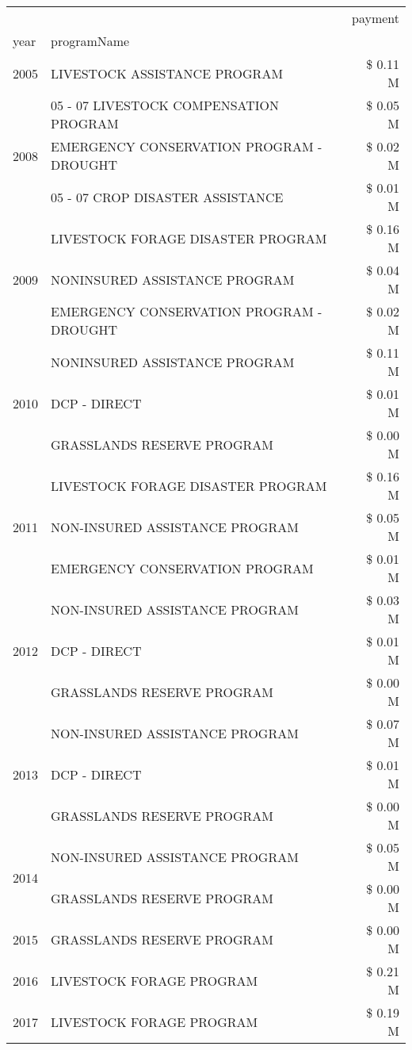 \begin{tabular}{llr}
\toprule
 &  & payment \\
year & programName &  \\
\midrule
2005 & LIVESTOCK ASSISTANCE PROGRAM & \$ 0.11 M \\
\cline{1-3}
\multirow[t]{3}{*}{2008} & 05 - 07 LIVESTOCK COMPENSATION PROGRAM & \$ 0.05 M \\
 & EMERGENCY CONSERVATION PROGRAM - DROUGHT & \$ 0.02 M \\
 & 05 - 07 CROP DISASTER ASSISTANCE & \$ 0.01 M \\
\cline{1-3}
\multirow[t]{3}{*}{2009} & LIVESTOCK FORAGE DISASTER  PROGRAM & \$ 0.16 M \\
 & NONINSURED ASSISTANCE PROGRAM & \$ 0.04 M \\
 & EMERGENCY CONSERVATION PROGRAM - DROUGHT & \$ 0.02 M \\
\cline{1-3}
\multirow[t]{3}{*}{2010} & NONINSURED ASSISTANCE PROGRAM & \$ 0.11 M \\
 & DCP - DIRECT & \$ 0.01 M \\
 & GRASSLANDS RESERVE PROGRAM & \$ 0.00 M \\
\cline{1-3}
\multirow[t]{3}{*}{2011} & LIVESTOCK FORAGE DISASTER PROGRAM & \$ 0.16 M \\
 & NON-INSURED ASSISTANCE PROGRAM & \$ 0.05 M \\
 & EMERGENCY CONSERVATION PROGRAM & \$ 0.01 M \\
\cline{1-3}
\multirow[t]{3}{*}{2012} & NON-INSURED ASSISTANCE PROGRAM & \$ 0.03 M \\
 & DCP - DIRECT & \$ 0.01 M \\
 & GRASSLANDS RESERVE PROGRAM & \$ 0.00 M \\
\cline{1-3}
\multirow[t]{3}{*}{2013} & NON-INSURED ASSISTANCE PROGRAM & \$ 0.07 M \\
 & DCP - DIRECT & \$ 0.01 M \\
 & GRASSLANDS RESERVE PROGRAM & \$ 0.00 M \\
\cline{1-3}
\multirow[t]{2}{*}{2014} & NON-INSURED ASSISTANCE PROGRAM & \$ 0.05 M \\
 & GRASSLANDS RESERVE PROGRAM & \$ 0.00 M \\
\cline{1-3}
2015 & GRASSLANDS RESERVE PROGRAM & \$ 0.00 M \\
\cline{1-3}
2016 & LIVESTOCK FORAGE PROGRAM & \$ 0.21 M \\
\cline{1-3}
\multirow[t]{2}{*}{2017} & LIVESTOCK FORAGE PROGRAM & \$ 0.19 M \\

\end{tabular}

